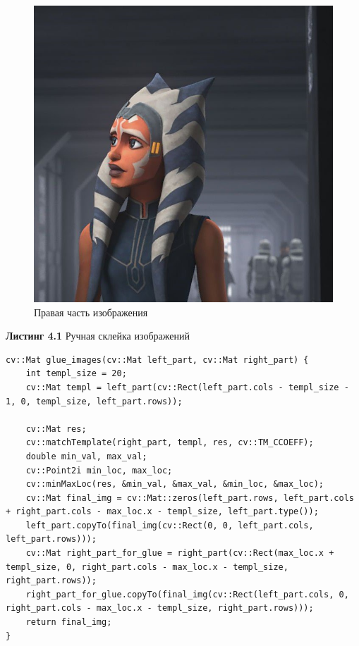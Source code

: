 \begin{figure}[h]
    \centering
    \includegraphics[scale= 0.3]{../images/original/glue_part_2.jpeg}
    \caption{Правая часть изображения}
\end{figure}
\newpage
\noindent \textbf{Листинг 4.1} Ручная склейка изображений
\begin{lstlisting}
cv::Mat glue_images(cv::Mat left_part, cv::Mat right_part) {
	int templ_size = 20;
	cv::Mat templ = left_part(cv::Rect(left_part.cols - templ_size - 1, 0, templ_size, left_part.rows));
	
	cv::Mat res;
	cv::matchTemplate(right_part, templ, res, cv::TM_CCOEFF);
	double min_val, max_val;
	cv::Point2i min_loc, max_loc;
	cv::minMaxLoc(res, &min_val, &max_val, &min_loc, &max_loc);
	cv::Mat final_img = cv::Mat::zeros(left_part.rows, left_part.cols + right_part.cols - max_loc.x - templ_size, left_part.type());
	left_part.copyTo(final_img(cv::Rect(0, 0, left_part.cols, left_part.rows)));
	cv::Mat right_part_for_glue = right_part(cv::Rect(max_loc.x + templ_size, 0, right_part.cols - max_loc.x - templ_size, right_part.rows));
	right_part_for_glue.copyTo(final_img(cv::Rect(left_part.cols, 0, right_part.cols - max_loc.x - templ_size, right_part.rows)));
	return final_img;
}
\end{lstlisting}
\newpage
